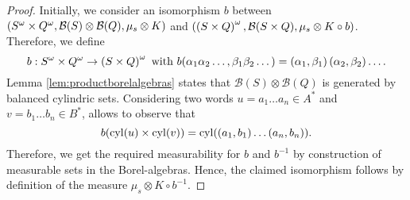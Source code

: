 \begin{proof}
  Initially, we consider an isomorphism $b$ between
  $\left(S^{\omega}\times Q^{\omega}, \mathcal{B}(S)\otimes\mathcal{B}(Q),
  \mu_{s}\otimes K\right)$ and $\left(\left(S\times Q\right)^{\omega},
  \mathcal{B}(S\times Q), \mu_{s}\otimes K\circ b\right)$. Therefore, we define
  \begin{equation*}
    b:S^{\omega}\times Q^{\omega}\rightarrow\left(S\times Q\right)^{\omega}
    \text{ with }b(\alpha_{1}\alpha_{2}\dots, \beta_{1}\beta_{2}\dots) = 
      \left(\alpha_{1}, \beta_{1}\right)\left(\alpha_{2}, \beta_{2}\right)\dots.
  \end{equation*}
  Lemma \ref{lem:productborelalgebras} states that
  $\mathcal{B}(S)\otimes\mathcal{B}(Q)$ is generated by balanced cylindric
  sets. Considering two words $u = a_{1}\dots a_{n}\in A^{*}$ and
  $v = b_{1}\dots b_{n}\in B^{*}$, allows to observe that
  \begin{equation*}
    b(\operatorname{cyl}(u)\times\operatorname{cyl}(v)) = \operatorname{cyl}(\left(a_{1}, b_{1}\right)\dots
      \left(a_{n}, b_{n}\right)).
  \end{equation*}
  Therefore, we get the required measurability for $b$ and $b^{-1}$ by
  construction of measurable sets in the Borel-algebras. Hence, the claimed
  isomorphism follows by definition of the measure
  $\mu_{s}\otimes K\circ b^{-1}$.


\end{proof}
